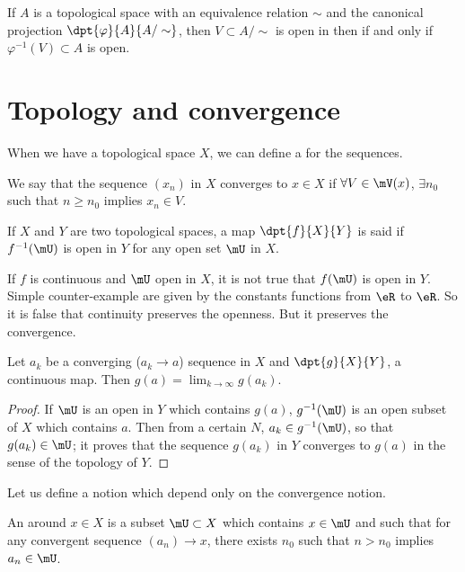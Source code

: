 If $A$ is a topological space with an equivalence relation $\sim$ and the canonical projection $\dpt{\varphi}{A}{A/\sim}$, then $V\subset A/\sim$ is open in then  if and only if $\varphi^{-1}(V)\subset A$ is open.

\section{Topology and convergence}

When we have a topological space $X$, we can define a  for the sequences.

\begin{definition}
We say that the sequence $(x_n)$ in $X$ converges to $x\in X$ if
$\forall V\in\mV(x)$, $\exists n_0$ such that $n\geq n_0$ implies $x_n\in V$. \label{def:convergence}
\end{definition}

\begin{definition}
If $X$ and $Y$ are two topological spaces, a map $\dpt{f}{X}{Y}$ is said  if $f^{-1}(\mU)$ is open in $Y$ for any open set $\mU$ in $X$.
\end{definition}

If $f$ is continuous and $\mU$ open in $X$, it is not true that $f(\mU)$ is open in $Y$. Simple counter-example are given by the constants functions from $\eR$ to $\eR$. So it is false that continuity preserves the openness. But it preserves the convergence.

\begin{proposition}
Let $a_k$ be a converging ($a_k\to a$) sequence in $X$ and $\dpt{g}{X}{Y}$, a continuous map. Then $g(a)=\lim_{k\to\infty}g(a_k)$.
\label{prop:continu_cv}
\end{proposition}
\begin{proof}
If $\mU$ is an open in $Y$ which contains $g(a)$, $g^{-1}(\mU)$ is an open subset of $X$ which contains $a$. Then from a certain $N$, $a_k\in g^{-1}(\mU)$, so that $g(a_k)\in\mU$; it proves that the sequence $g(a_k)$ in $Y$ converges to $g(a)$ in the sense of the topology of $Y$.
\end{proof}

Let us define a notion which depend only on the convergence notion.

\begin{definition}
An  around $x\in X$ is a subset $\mU\subset X$ which contains $x\in\mU$ and such that for any convergent sequence $(a_n)\to x$, there exists $n_0$ such that $n>n_0$ implies $a_n\in\mU$.
\end{definition}

